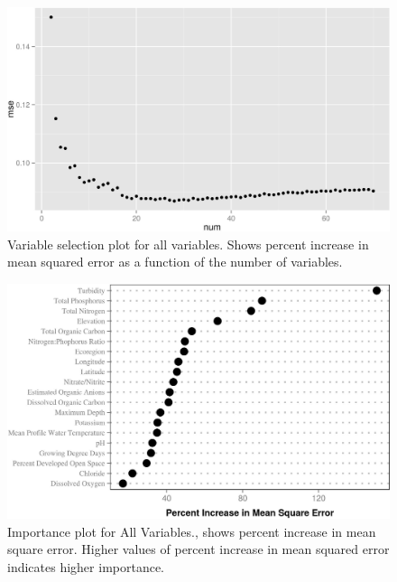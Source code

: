\documentclass[11pt,]{article}
\begin{document}
\begin{figure}[htbp]
\centering
\includegraphics{manuscript_files/figure-latex/all_var_sel_figure-1.jpeg}
\caption{Variable selection plot for all variables. Shows percent
increase in mean squared error as a function of the number of variables.
\label{fig:all_varsel_figure}}
\end{figure}

\newpage

\begin{figure}[htbp]
\centering
\includegraphics{manuscript_files/figure-latex/All_Importance-1.jpeg}
\caption{Importance plot for All Variables., shows percent increase in
mean square error. Higher values of percent increase in mean squared
error indicates higher importance. \label{fig:All_Importance}}
\end{figure}

\newpage

\newpage

\newpage

\newpage
\end{document}
